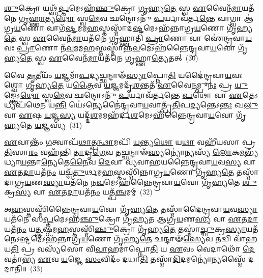 \-\ul{𑌶𑍁}\-𑌕𑍍𑌰𑍋 𑌯𑌥𑍍𑌸᳴\-\ul{𑌪𑍍𑌤}\-𑌮𑍇\-𑌽𑌹᳴\-\ul{𑌞𑍍𑌛𑍁}\-𑌕𑍍𑌰𑍋 \ul{𑌗𑍃}\-𑌹𑍍𑌯\-\ul{𑌤𑍇} 𑌸𑍍𑌵 \ul{𑌏}\-𑌵𑍈𑌨᳴\-\ul{𑌮𑌾}\-𑌯𑌤᳴𑌨𑍇 𑌗𑍃\-\ul{𑌹𑍍𑌣𑌾}\-𑌤𑍍𑌯\-\ul{𑌥𑍋} 𑌸𑍍𑌵\-\ul{𑌮𑍇}\-𑌵 𑌛𑌨𑍍𑌦𑍋\-𑌽𑌨𑍁᳴ \ul{𑌪}\-𑌰𑍍𑌯𑌾𑌵᳴𑌰𑍍𑌤\-\ul{𑌨𑍍𑌤𑍇} 𑌵𑌾𑌗𑍍𑌵𑌾 𑌆॑𑌗𑍍𑌰\-\ul{𑌯}\-𑌣𑍋 𑌵𑌾𑌗᳴\-\ul{𑌷𑍍𑌟}\-𑌮𑌮\-\ul{𑌹}\-𑌸𑍍𑌤𑌸𑍍𑌮𑌾᳴𑌦\-\ul{𑌷𑍍𑌟}\-𑌮𑍇\-𑌽𑌹᳴𑌨𑍍𑌨𑌾𑌗𑍍𑌰\-\ul{𑌯}\-𑌣𑍋 𑌗𑍃᳴𑌹𑍍𑌯\-\ul{𑌤𑍇} 𑌸𑍍𑌵 \ul{𑌏}\-𑌵𑍈𑌨᳴\-\ul{𑌮𑌾}\-𑌯𑌤᳴𑌨𑍇 𑌗𑍃𑌹𑍍𑌣𑌾𑌤𑌿 \ul{𑌪𑍍𑌰𑌾}\-𑌣𑍋 𑌵𑌾 𑌐॑𑌨𑍍𑌦𑍍𑌰𑌵𑌾\-\ul{𑌯}\-𑌵𑌃 \ul{𑌪𑍍𑌰𑌾}\-𑌣𑍋 𑌨᳴\-\ul{𑌵}\-𑌮𑌮\-\ul{𑌹}\-𑌸𑍍𑌤𑌸𑍍𑌮𑌾॑𑌨𑍍𑌨\-\ul{𑌵}\-𑌮𑍇\-𑌽𑌹᳴𑌨𑍍𑌨𑍈𑌨𑍍𑌦𑍍𑌰𑌵𑌾\-\ul{𑌯}\-𑌵𑍋 𑌗𑍃᳴𑌹𑍍𑌯\-\ul{𑌤𑍇} 𑌸𑍍𑌵 \ul{𑌏}\-𑌵𑍈𑌨᳴\-\ul{𑌮𑌾}\-𑌯𑌤᳴𑌨𑍇 𑌗𑍃𑌹𑍍𑌣𑌾\-\ul{𑌤𑍍𑌯𑍇}\-𑌤𑌤𑍍~(30)

𑌵𑍈 \ul{𑌤𑍃}\-𑌤𑍀𑌯𑌂᳴ \ul{𑌯}\-𑌜𑍍𑌞𑌮𑌾᳴\-\ul{𑌪}\-𑌦𑍍𑌯𑌚𑍍𑌛𑌨𑍍𑌦𑌾𑍟᳴\-\ul{𑌸𑍍𑌯𑌾}\-𑌪𑍍𑌨𑍋\-\ul{𑌤𑌿} 𑌯𑌦𑍈॑𑌨𑍍𑌦𑍍𑌰𑌵𑌾\-\ul{𑌯}\-𑌵𑌃 𑌶𑍍𑌵𑍋 \ul{𑌗𑍃}\-𑌹𑍍𑌯\-\ul{𑌤𑍇} 𑌯\-\ul{𑌤𑍍𑌰𑍈}\-𑌵 \ul{𑌯}\-𑌜𑍍𑌞𑌮𑌦𑍃᳴\-\ul{𑌶}\-𑌨𑍍𑌤𑌤᳴ \ul{𑌏}\-𑌵𑍈\-\ul{𑌨}\-𑌮𑍍𑌪𑍁\-\ul{𑌨𑌃} 𑌪𑍍𑌰 \ul{𑌯𑍁}\-𑌙𑍍𑌕𑍍𑌤𑍇\-𑌽\-\ul{𑌥𑍋} 𑌸𑍍𑌵\-\ul{𑌮𑍇}\-𑌵 𑌛𑌨𑍍𑌦𑍋\-𑌽𑌨𑍁᳴ \ul{𑌪}\-𑌰𑍍𑌯𑌾𑌵᳴𑌰𑍍𑌤𑌨𑍍𑌤𑍇 \ul{𑌪}\-𑌥𑍋 𑌵𑌾 \ul{𑌏}\-𑌤𑍇\-𑌽𑌧𑍍𑌯𑌪᳴𑌥𑍇𑌨 𑌯\-\ul{𑌨𑍍𑌤𑌿} 𑌯𑍇॑\-𑌽𑌨𑍍𑌯𑍇𑌨𑍈॑𑌨𑍍𑌦𑍍𑌰𑌵𑌾\-\ul{𑌯}\-𑌵𑌾𑌤𑍍𑌪𑍍𑌰᳴\-\ul{𑌤𑌿}\-𑌪\-\ul{𑌦𑍍𑌯}\-𑌨𑍍𑌤𑍇\-𑌽\-\ul{𑌨𑍍𑌤𑌃} 𑌖\-\ul{𑌲𑍁} 𑌵𑌾 \ul{𑌏}\-𑌷 \ul{𑌯}\-𑌜𑍍𑌞\-\ul{𑌸𑍍𑌯} 𑌯𑌦𑍍𑌦᳴\-\ul{𑌶}\-𑌮𑌮𑌹᳴𑌰𑍍𑌦\-\ul{𑌶}\-𑌮𑍇\-𑌽𑌹᳴𑌨𑍍𑌨𑍈𑌨𑍍𑌦𑍍𑌰𑌵𑌾\-\ul{𑌯}\-𑌵𑍋 𑌗𑍃᳴𑌹𑍍𑌯𑌤𑍇 \ul{𑌯}\-𑌜𑍍𑌞𑌸𑍍𑌯᳴~(31)

\-\ul{𑌏}\-𑌵𑌾𑌨𑍍𑌤𑌂᳴ \ul{𑌗}\-𑌤𑍍𑌵𑌾𑌪᳴\-\ul{𑌥𑌾}\-𑌤𑍍𑌪\-\ul{𑌨𑍍𑌥𑌾}\-𑌮𑌪𑌿᳴ \ul{𑌯}\-𑌨𑍍𑌤𑍍𑌯\-\ul{𑌥𑍋} 𑌯\-\ul{𑌥𑌾} 𑌵𑌹𑍀᳴𑌯𑌸𑌾 𑌪𑍍𑌰\-\ul{𑌤𑌿}\-𑌸𑌾\-\ul{𑌰𑌂} 𑌵𑌹᳴𑌨𑍍𑌤𑌿 \ul{𑌤𑌾}\-𑌦𑍃\-\ul{𑌗𑍇}\-𑌵 𑌤𑌚𑍍𑌛𑌨𑍍𑌦𑌾𑍟᳴\-\ul{𑌸𑍍𑌯}\-𑌨𑍍𑌯𑍋॑𑌨𑍍𑌯𑌸𑍍𑌯᳴ \ul{𑌲𑍋}\-𑌕\-\ul{𑌮}\-𑌭𑍍𑌯᳴𑌧𑍍𑌯𑌾\-\ul{𑌯}\-𑌨𑍍𑌤𑌾\-\ul{𑌨𑍍𑌯𑍇}\-𑌤𑍇\-\ul{𑌨𑍈}\-𑌵 \ul{𑌦𑍇}\-𑌵𑌾 𑌵𑍍𑌯᳴𑌵𑌾𑌹𑌯𑌨𑍍𑌨𑍈𑌨𑍍𑌦𑍍𑌰𑌵𑌾\-\ul{𑌯}\-𑌵\-\ul{𑌸𑍍𑌯} 𑌵𑌾 \ul{𑌏}\-𑌤\-\ul{𑌦𑌾}\-𑌯𑌤᳴\-\ul{𑌨𑌂} 𑌯𑌚𑍍𑌚᳴\-\ul{𑌤𑍁}\-𑌰𑍍𑌥𑌮\-\ul{𑌹}\-𑌸𑍍𑌤𑌸𑍍𑌮𑌿᳴𑌨𑍍𑌨𑌾𑌗𑍍𑌰\-\ul{𑌯}\-𑌣𑍋 𑌗𑍃᳴𑌹𑍍𑌯\-\ul{𑌤𑍇} 𑌤𑌸𑍍𑌮𑌾᳴𑌦𑌾𑌗𑍍𑌰\-\ul{𑌯}\-𑌣\-\ul{𑌸𑍍𑌯𑌾}\-𑌯𑌤᳴𑌨𑍇 𑌨\-\ul{𑌵}\-𑌮𑍇\-𑌽𑌹᳴𑌨𑍍𑌨𑍈𑌨𑍍𑌦𑍍𑌰𑌵𑌾\-\ul{𑌯}\-𑌵𑍋 𑌗𑍃᳴𑌹𑍍𑌯𑌤𑍇 \ul{𑌶𑍁}\-𑌕𑍍𑌰\-\ul{𑌸𑍍𑌯} 𑌵𑌾 \ul{𑌏}\-𑌤\-\ul{𑌦𑌾}\-𑌯𑌤᳴\-\ul{𑌨𑌂} 𑌯𑌤𑍍𑌪᳴\-\ul{𑌞𑍍𑌚}\-𑌮𑌮𑍍~(32)

𑌅\-\ul{𑌹}\-𑌸𑍍𑌤𑌸𑍍𑌮𑌿᳴𑌨𑍍𑌨𑍈𑌨𑍍𑌦𑍍𑌰𑌵𑌾\-\ul{𑌯}\-𑌵𑍋 𑌗𑍃᳴𑌹𑍍𑌯\-\ul{𑌤𑍇} 𑌤𑌸𑍍𑌮𑌾᳴𑌦𑍈𑌨𑍍𑌦𑍍𑌰𑌵𑌾\-\ul{𑌯}\-𑌵\-\ul{𑌸𑍍𑌯𑌾}\-𑌯𑌤᳴𑌨𑍇 𑌸\-\ul{𑌪𑍍𑌤}\-𑌮𑍇\-𑌽𑌹᳴\-\ul{𑌞𑍍𑌛𑍁}\-𑌕𑍍𑌰𑍋 𑌗𑍃᳴𑌹𑍍𑌯𑌤 𑌆𑌗𑍍𑌰\-\ul{𑌯}\-𑌣\-\ul{𑌸𑍍𑌯} 𑌵𑌾 \ul{𑌏}\-𑌤\-\ul{𑌦𑌾}\-𑌯𑌤᳴\-\ul{𑌨𑌂} 𑌯\-\ul{𑌤𑍍𑌷}\-𑌷𑍍𑌠𑌮\-\ul{𑌹}\-𑌸𑍍𑌤𑌸𑍍𑌮𑌿᳴\-\ul{𑌞𑍍𑌛𑍁}\-𑌕𑍍𑌰𑍋 𑌗𑍃᳴𑌹𑍍𑌯\-\ul{𑌤𑍇} 𑌤𑌸𑍍𑌮𑌾॑\-\ul{𑌚𑍍𑌛𑍁}\-𑌕𑍍𑌰\-\ul{𑌸𑍍𑌯𑌾}\-𑌯𑌤᳴𑌨𑍇\-𑌽\-\ul{𑌷𑍍𑌟}\-𑌮𑍇\-𑌽𑌹᳴𑌨𑍍𑌨𑌾𑌗𑍍𑌰\-\ul{𑌯}\-𑌣𑍋 𑌗𑍃᳴𑌹𑍍𑌯\-\ul{𑌤𑍇} 𑌛𑌨𑍍𑌦𑌾𑍟᳴\-\ul{𑌸𑍍𑌯𑍇}\-𑌵 𑌤𑌦𑍍𑌵𑌿 𑌵𑌾᳴𑌹𑌯\-\ul{𑌤𑌿} 𑌪𑍍𑌰 𑌵𑌸𑍍𑌯᳴𑌸𑍋 𑌵𑌿\-\ul{𑌵𑌾}\-𑌹𑌮𑌾॑𑌪𑍍𑌨𑍋\-\ul{𑌤𑌿} 𑌯 \ul{𑌏}\-𑌵𑌂 𑌵𑍇𑌦𑌾𑌥𑍋᳴ \ul{𑌦𑍇}\-𑌵𑌤𑌾॑𑌭𑍍𑌯 \ul{𑌏}\-𑌵 \ul{𑌯}\-𑌜𑍍𑌞𑍇 \ul{𑌸𑌂}\-𑌵𑌿𑌦𑌂᳴ 𑌦𑌧𑌾\-\ul{𑌤𑌿} 𑌤𑌸𑍍𑌮𑌾᳴\-\ul{𑌦𑌿}\-𑌦𑌮𑌨𑍍𑌯𑍋॑𑌨𑍍𑌯𑌸𑍍𑌮𑍈᳴ 𑌦𑌦𑌾𑌤𑌿॥~(33)

{\anuvakamend[{\-\ul{𑌏}\-𑌤𑌦𑍍𑌵𑍈 𑌪᳴\-\ul{𑌞𑍍𑌚}\-𑌮𑍇\-𑌽\-\ul{𑌹}\-𑌨𑍍𑌤𑍍𑌰𑍈𑌷𑍍𑌟𑍁᳴𑌭 \ul{𑌏}\-𑌤𑌦𑍍𑌗𑍃᳴𑌹𑍍𑌯𑌤𑍇 \ul{𑌯}\-𑌜𑍍𑌞𑌸𑍍𑌯᳴ 𑌪़\-\ul{𑌞𑍍𑌚}\-𑌮\-\ul{𑌮}\-𑌨𑍍𑌯\-\ul{𑌸𑍍𑌮𑌾} 𑌏𑌕᳴𑌞𑍍𑌚}]}%

